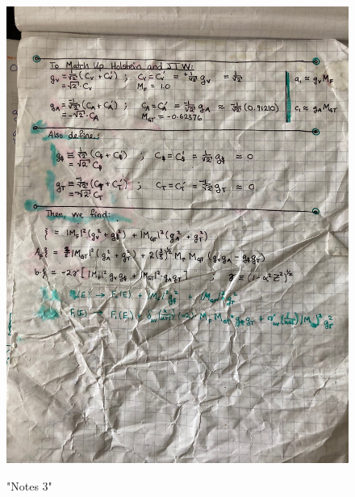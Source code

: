 \begin{figure}[htb]
	\centering
	{\includegraphics[width=.999\linewidth]
	{Figures/oldnotes_holstein_jtw/image3.jpg} }
	\caption{"Notes 3"}
	\label{fig:notes3}
\end{figure}

